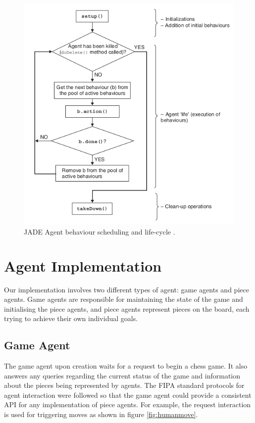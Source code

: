 \documentclass{article}
\begin{document}
\begin{figure}[!ht]
	\centering
	\includegraphics[width=0.8\linewidth]{images/behaviour}
	\caption{JADE Agent behaviour scheduling and life-cycle \cite{jade}.}
	\label{fig:behaviour}
\end{figure}

\section{Agent Implementation} \label{sec:agentimpl}

Our implementation involves two different types of agent: game agents and piece agents. Game agents are responsible for maintaining the state of the game and initialising the piece agents, and piece agents represent pieces on the board, each trying to achieve their own individual goals.

\subsection{Game Agent}

The game agent upon creation waits for a request to begin a chess game. It also answers any queries regarding the current status of the game and information about the pieces being represented by agents. The FIPA standard protocols for agent interaction \cite{fipaprotocols} were followed so that the game agent could provide a consistent API for any implementation of piece agents. For example, the request interaction is used for triggering moves as shown in figure \ref{fig:humanmove}. 
\end{document}
